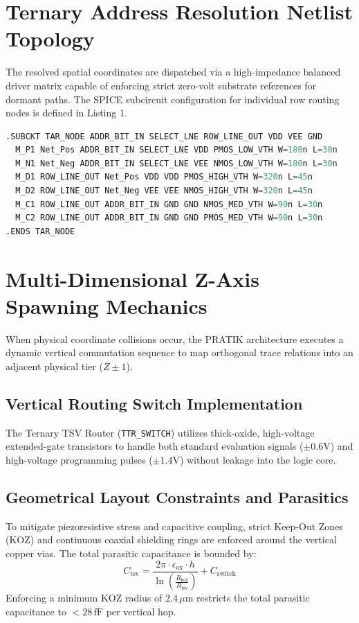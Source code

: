 \documentclass[journal,twocolumn,10pt]{IEEEtran}
\begin{document}
\section{Ternary Address Resolution Netlist Topology}
The resolved spatial coordinates are dispatched via a high-impedance balanced driver matrix capable of enforcing strict zero-volt substrate references for dormant paths. The SPICE subcircuit configuration for individual row routing nodes is defined in Listing 1.

\begin{lstlisting}[language=Verilog, caption={Ternary Address Resolution Node (TAR\_NODE) Subcircuit.}]
.SUBCKT TAR_NODE ADDR_BIT_IN SELECT_LNE ROW_LINE_OUT VDD VEE GND
  M_P1 Net_Pos ADDR_BIT_IN SELECT_LNE VDD PMOS_LOW_VTH W=180n L=30n
  M_N1 Net_Neg ADDR_BIT_IN SELECT_LNE VEE NMOS_LOW_VTH W=180n L=30n
  M_D1 ROW_LINE_OUT Net_Pos VDD VDD PMOS_HIGH_VTH W=320n L=45n
  M_D2 ROW_LINE_OUT Net_Neg VEE VEE NMOS_HIGH_VTH W=320n L=45n
  M_C1 ROW_LINE_OUT ADDR_BIT_IN GND GND NMOS_MED_VTH W=90n L=30n
  M_C2 ROW_LINE_OUT ADDR_BIT_IN GND GND PMOS_MED_VTH W=90n L=30n
.ENDS TAR_NODE
\end{lstlisting}

\section{Multi-Dimensional Z-Axis Spawning Mechanics}
When physical coordinate collisions occur, the PRATIK architecture executes a dynamic vertical commutation sequence to map orthogonal trace relations into an adjacent physical tier ($Z \pm 1$).

\subsection{Vertical Routing Switch Implementation}
The Ternary TSV Router (\texttt{TTR\_SWITCH}) utilizes thick-oxide, high-voltage extended-gate transistors to handle both standard evaluation signals ($\pm 0.6$V) and high-voltage programming pulses ($\pm 1.4$V) without leakage into the logic core.

\subsection{Geometrical Layout Constraints and Parasitics}
To mitigate piezoresistive stress and capacitive coupling, strict Keep-Out Zones (KOZ) and continuous coaxial shielding rings are enforced around the vertical copper vias. The total parasitic capacitance is bounded by:
\begin{equation}
C_{\text{tsv}} = \frac{2\pi \cdot \epsilon_{\text{ox}} \cdot h}{\ln\left(\frac{R_{\text{koz}}}{R_{\text{tsv}}}\right)} + C_{\text{switch}}
\end{equation}
Enforcing a minimum KOZ radius of $2.4\,\mu\text{m}$ restricts the total parasitic capacitance to $< 28\,\text{fF}$ per vertical hop.
\end{document}
